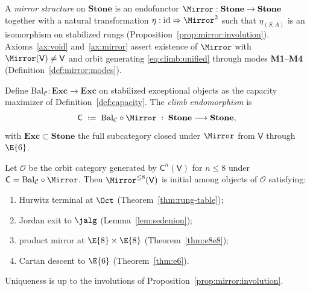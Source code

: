 \begin{definition}\label{def:mirror-functor}
A \emph{mirror structure} on $\mathbf{Stone}$ is an endofunctor
$\Mirror:\mathbf{Stone}\to\mathbf{Stone}$ together with a natural
transformation $\eta:\mathrm{id}\Rightarrow\Mirror^2$ such that
$\eta_{(S,A)}$ is an isomorphism on stabilized rungs
(Proposition~\ref{prop:mirror:involution}). Axioms~\ref{ax:void}
and~\ref{ax:mirror} assert existence of $\Mirror$ with
$\Mirror(\mathsf{V})\neq\mathsf{V}$ and orbit generating
\eqref{eq:climb:unified} through modes \textbf{M1}--\textbf{M4}
(Definition~\ref{def:mirror:modes}).
\end{definition}

\begin{definition}\label{def:climb-morphism}
Define $\mathrm{Bal}_{\mathcal{C}}:\mathbf{Exc}\to\mathbf{Exc}$ on stabilized
exceptional objects as the capacity maximizer of
Definition~\ref{def:capacity}. The \emph{climb endomorphism} is
\begin{equation}\label{eq:formal-climb}
  \mathsf{C}
  \;:=\;
  \mathrm{Bal}_{\mathcal{C}}\circ\Mirror
  \;:\;
  \mathbf{Stone}\longrightarrow\mathbf{Stone},
\end{equation}
with $\mathbf{Exc}\subset\mathbf{Stone}$ the full subcategory closed under
$\Mirror$ from $\mathsf{V}$ through $\E{6}$.
\end{definition}

\begin{proposition}
\label{prop:formal-climb-initial}
Let $\mathcal{O}$ be the orbit category generated by $\mathsf{C}^n(\mathsf{V})$
for $n\leq 8$ under $\mathsf{C}=\mathrm{Bal}_{\mathcal{C}}\circ\Mirror$.
Then $\Mirror^{\leq 8}(\mathsf{V})$ is initial among objects of $\mathcal{O}$
satisfying:
\begin{enumerate}[label=(\roman*),leftmargin=*]
  \item Hurwitz terminal at $\Oct$ (Theorem~\ref{thm:rung-table});
  \item Jordan exit to $\jalg$ (Lemma~\ref{lem:sedenion});
  \item product mirror at $\E{8}\times\E{8}$ (Theorem~\ref{thm:e8e8});
  \item Cartan descent to $\E{6}$ (Theorem~\ref{thm:e6}).
\end{enumerate}
Uniqueness is up to the involutions of Proposition~\ref{prop:mirror:involution}.
\end{proposition}

